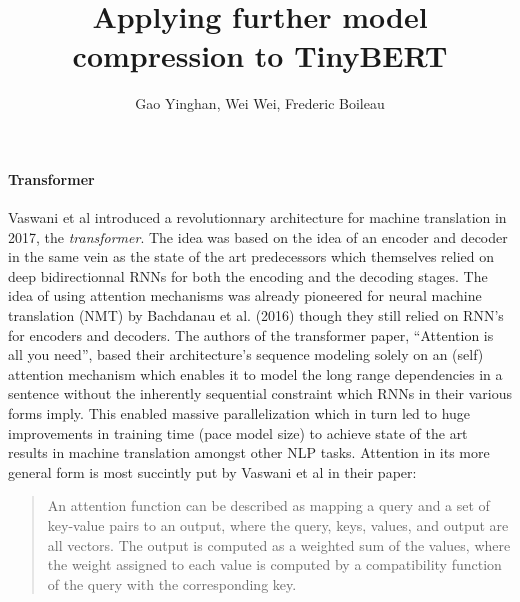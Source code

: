 \documentclass{article}
\title{\textbf{Applying further model compression to TinyBERT}}
\author{Gao Yinghan, Wei Wei, Frederic Boileau}
\begin{document}
\thispagestyle{plain}
\maketitle
\medskip


\paragraph{Transformer} Vaswani et al \cite{allyouneed} introduced a
revolutionnary architecture for machine translation in 2017, the
\textit{transformer}.  The idea was based on the idea of an encoder and decoder
in the same vein as the state of the art predecessors which themselves relied on
deep bidirectionnal RNNs for both the encoding and the decoding stages. The idea
of using attention mechanisms was already pioneered for neural machine
translation (NMT) by Bachdanau et al. (2016)\cite{bahdanau2016neural} though
they still relied on RNN's for encoders and decoders. The authors of the
transformer paper, ``Attention is all you need'', based their architecture's
sequence modeling solely on an (self) attention mechanism which enables it to
model the long range dependencies in a sentence without the inherently
sequential constraint which RNNs in their various forms imply. This enabled
massive parallelization which in turn led to huge improvements in training time
(pace model size) to achieve state of the art results in machine translation
amongst other NLP tasks.  Attention in its more general form is most succintly
put by Vaswani et al in their paper: \blockcquote{allyouneed}{An attention
function can be described as mapping a query and a set of key-value pairs to an
output, where the query, keys, values, and output are all vectors.  The output
is computed as a weighted sum of the values, where the weight assigned to each
value is computed by a compatibility function of the
query with the corresponding key.}

\end{document}
